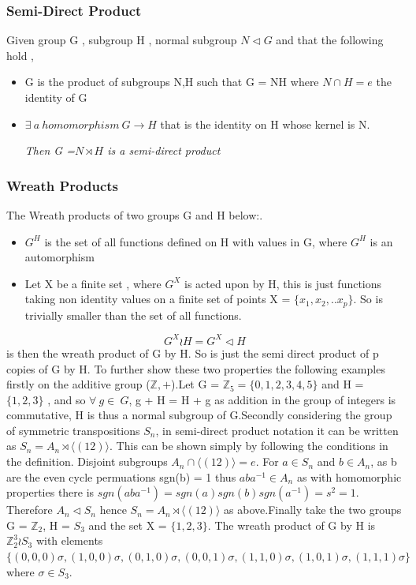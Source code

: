 \documentclass{article}
\begin{document}
\subsubsection{Semi-Direct Product}
Given group G , subgroup H , normal subgroup $N \triangleleft G$ and that the following hold ,
\begin{itemize}
\item G is the product of subgroups N,H such that G = NH where $N \cap H = {e}$ the identity of G
\item $\exists \ a \ homomorphism \ G \rightarrow H$ that is the identity on H whose kernel is N.

\textit{Then G =$N \rtimes H$ is a semi-direct product}

\end{itemize}

\subsubsection{Wreath Products}

The Wreath products of two groups G and H below:.
\begin{itemize}
	\item $G^{H}$ is the set of all functions defined on H with values in G, where $G^{H}$ is an automorphism 
    \item Let X be a finite set , where $G^{X}$ is acted upon by H, this is just functions taking non identity values on a finite set of points X = $\{x_{1},x_{2},.. x_{p}\}$. So is trivially smaller than the set of all functions.
\end{itemize}
\begin{equation}
	G^{X} \wr  H = G^{X} \triangleleft H
\end{equation}
is then the wreath product of G by H. So is just the semi direct product of p copies of G by H\cite{Wreath}.
To further show these two properties the following examples firstly on the additive group ($\mathbb{Z},+$).\newline Let G = $\mathbb{Z}_{5} = \{0,1,2,3,4,5\}$ and H = $\{1,2,3\}$ , and so $\forall\ g \in\ G$, g + H = H + g as addition in the group of integers is commutative, H is thus a normal subgroup of G.\newline Secondly considering the group of symmetric transpositions $S_{n}$, in semi-direct product notation it can be written as $S_{n} = A_{n} \rtimes \langle(12)\rangle$. This can be shown simply by following the conditions in the definition. Disjoint subgroups $A_{n} \cap \langle(12)\rangle = e$. For $a \in S_{n}$ and $b \in A_{n}$, as b are the even cycle permuations sgn(b) = 1 thus $aba^{-1} \in A_{n}$ as with homomorphic properties there is $sgn(aba^{-1}) = sgn(a)sgn(b)sgn(a^{-1}) = s^{2} = 1$. Therefore $A_{n} \triangleleft S_{n}$ hence $S_{n} = A_{n} \rtimes \langle(12)\rangle$ as above.\newline Finally take the two groups G = $\mathbb{Z}_{2}$, H = $S_3$ and the set X = $\{1,2,3\}$. The wreath product of G by H is $\mathbb{Z}_{2}^{3} \wr S_3$ with elements $\{(0,0,0)\sigma,(1,0,0)\sigma,(0,1,0)\sigma,(0,0,1)\sigma,(1,1,0)\sigma,(1,0,1)\sigma,(1,1,1)\sigma\}$ where $\sigma \in S_3$.
\end{document}
